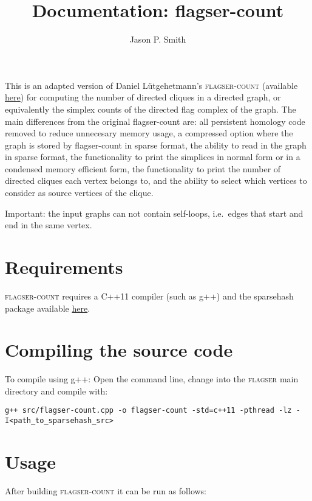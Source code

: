 \documentclass{amsart}
\theoremstyle{definition}
\begin{document}
\title{Documentation: flagser-count}

\author{Jason P. Smith}
\address{University of Aberdeen, Aberdeen, United Kingdom}

\maketitle

\noindent
This is an adapted version of Daniel Lütgehetmann's \textsc{flagser-count} (available \href{https://github.com/luetge/flagser}{here}) for computing
the number of directed cliques in a directed graph, or equivalently the simplex counts of the directed flag complex of the graph.
The main differences from the original flagser-count are: all persistent homology code removed to reduce unnecesary memory usage,
a compressed option where the graph is stored by flagser-count in sparse format,
the ability to read in the graph in sparse format, the functionality to print the simplices in normal form or in a condensed memory efficient form,
the functionality to print the number of directed cliques each vertex belongs to, and the ability to select which vertices to consider as source vertices of the clique.


Important: the input graphs can not contain self-loops, i.e.\ edges that start and end in the same
vertex.

\section{Requirements}
\noindent
\textsc{flagser-count} requires a C++11 compiler (such as g++) and the sparsehash package available \href{https://github.com/sparsehash/sparsehash}{here}.


\section{Compiling the source code}
\noindent
To compile using g++: Open the command line, change into the \textsc{flagser} main directory and compile with:
\vspace{1em}

\begin{verbatim}g++ src/flagser-count.cpp -o flagser-count -std=c++11 -pthread -lz -I<path_to_sparsehash_src>\end{verbatim}

\section{Usage}
\noindent
After building \textsc{flagser-count} it can be run as follows:
\end{document}
